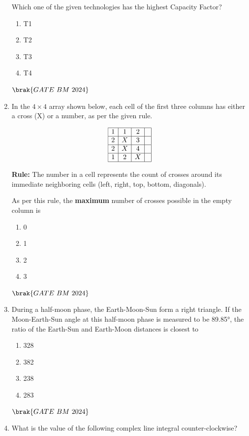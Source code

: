 \documentclass[journal,12pt,onecolumn]{IEEEtran}
\theoremstyle{remark}
\begin{document}
\begin{enumerate}
Which one of the given technologies has the highest Capacity Factor? 
\begin{enumerate}[label=(\Alph*)]
    \item T1
    \item T2
    \item T3
    \item T4
\end{enumerate}    
\hfill $\brak{GATE\ BM\ 2024}$  

\item In the $4 \times 4$ array shown below, each cell of the first three columns has either a cross (X) or a number, as per the given rule.  

\[
\begin{array}{|c|c|c|c|}
\hline
1 & 1 & 2 &  \\ \hline
2 & X & 3 &  \\ \hline
2 & X & 4 &  \\ \hline
1 & 2 & X &  \\ \hline
\end{array}
\]

\textbf{Rule:} The number in a cell represents the count of crosses around its immediate neighboring cells (left, right, top, bottom, diagonals).  

As per this rule, the \textbf{maximum} number of crosses possible in the empty column is \underline{\hspace{2cm}}
\begin{enumerate}[label=(\Alph*)]
    \item 0
    \item 1
    \item 2
    \item 3
\end{enumerate}    
\hfill $\brak{GATE\ BM\ 2024}$     

\item During a half-moon phase, the Earth-Moon-Sun form a right triangle. If the
Moon-Earth-Sun angle at this half-moon phase is measured to be 89.85°, the ratio
of the Earth-Sun and Earth-Moon distances is closest to
\begin{enumerate}[label=(\Alph*)]
    \item 328
    \item 382
    \item 238
    \item 283
\end{enumerate}    
\hfill $\brak{GATE\ BM\ 2024}$ 

\item What is the value of the following complex line integral counter-clockwise?


\end{enumerate}
\end{document}
